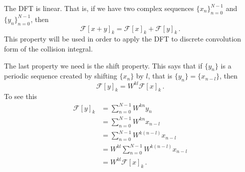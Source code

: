 \documentclass[12pt]{CSUNthesis}
\def\calF{\mathcal{F}}
\begin{document}
The DFT is linear. That is, if we have two complex sequences $\{x_n\}_{n=0}^{N-1}$ and $\{y_n\}_{n=0}^{N-1}$, then 
\begin{equation}
\label{eq:dft_lin}
\calF[x+y]_k = \calF[x]_k + \calF[y]_k\, .
\end{equation}
This property will be used in order to apply the DFT to discrete convolution form of the collision integral.

The last property we need is the shift property. This says that if $\{y_n\}$ is a periodic sequence created by shifting $\{x_n\}$ by $l$, that is $\{y_n\} = \{x_{n-l}\}$, then
\begin{equation}
\label{eq:shift_prop}
\calF[y]_k = W^{kl}\calF[x]_k\, .
\end{equation}
To see this
\begin{align*}
\calF[y]_k &= \sum_{n=0}^{N-1} W^{kn} y_n \\
&= \sum_{n=0}^{N-1} W^{kn} x_{n-l} \\
&= \sum_{n=0}^{N-1}  W^{k(n-l)} x_{n-l} \\
&= W^{kl} \sum_{n=0}^{N-1} W^{k(n-l)}x_{n-l} \\
&= W^{kl} \calF[x]_k\, .
\end{align*}
\end{document}
